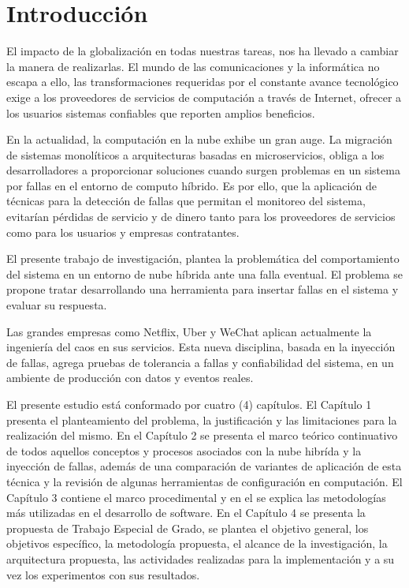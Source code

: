 \chapter{Introducci\'on}

\par El impacto de la globalización en todas nuestras tareas, nos ha llevado a cambiar la manera  de realizarlas. El mundo de las comunicaciones y la informática no escapa a ello, las transformaciones requeridas por el constante avance tecnológico exige a los proveedores de servicios de computación a través de Internet, ofrecer a los usuarios sistemas confiables que reporten amplios beneficios. \\
 
\par En la actualidad, la computación en la nube exhibe un gran auge. La migración de sistemas monolíticos a arquitecturas basadas en microservicios, obliga a los desarrolladores a proporcionar soluciones cuando surgen problemas en un sistema por fallas en el entorno de computo híbrido. Es por ello, que la aplicación de técnicas para la detección de fallas que permitan el monitoreo del sistema, evitarían pérdidas de servicio y de dinero tanto para los proveedores de servicios como para los usuarios y empresas contratantes.\\


\par El presente trabajo de investigación, plantea la problemática del comportamiento del sistema en un entorno de nube híbrida ante una falla eventual. El problema se propone tratar desarrollando una herramienta para insertar fallas en el sistema y evaluar su respuesta.\\ %

\par Las grandes empresas como Netflix, Uber y WeChat aplican actualmente la ingeniería del caos en sus servicios. Esta nueva disciplina, basada en la inyección de fallas, agrega pruebas de tolerancia a fallas y confiabilidad del sistema, en un ambiente de producción con datos y eventos reales.\\

\par El presente estudio está conformado por cuatro (4) capítulos. El Capítulo 1 presenta el planteamiento del problema, la justificación y las limitaciones para la realización del mismo. En el Capítulo 2 se presenta el marco teórico continuativo de todos aquellos conceptos y procesos asociados con la nube hibrída y la inyección de fallas, además de una comparación de variantes de aplicación de esta técnica y la revisión de algunas herramientas de configuración en computación. El Capítulo 3 contiene el marco procedimental y en el se explica las metodologías más utilizadas en el desarrollo de software. En el Capítulo 4 se presenta la propuesta de Trabajo Especial de Grado, se plantea el objetivo general, los objetivos específico, la metodología propuesta, el alcance de la investigación, la arquitectura propuesta, las actividades realizadas para la implementación y a su vez los experimentos con sus resultados.

